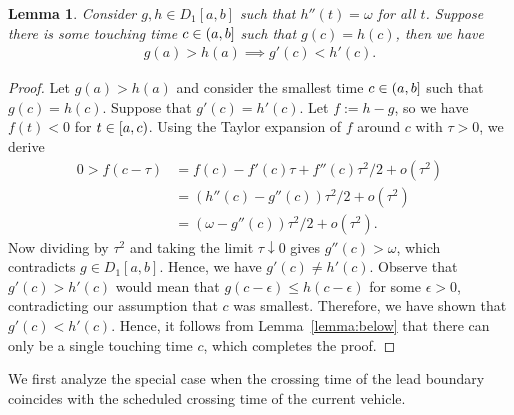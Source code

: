 \documentclass[a4paper]{article}
\theoremstyle{definition}
\theoremstyle{plain}
\newtheorem{lemma}{Lemma}
\begin{document}
\begin{lemma}
  \label{lemma:cross-acc}
  Consider $g,h \in D_{1}[a, b]$ such that $h''(t) = \omega$ for all $t$.
  Suppose there is some touching time $c \in (a,b]$ such that $g(c) = h(c)$, then
  we have
  \begin{align*}
    g(a) > h(a) \implies g'(c) < h'(c) .
  \end{align*}
\end{lemma}
\begin{proof}
  Let $g(a) > h(a)$ and consider the smallest time $c \in (a,b]$ such
  that $g(c) = h(c)$. Suppose that $g'(c) = h'(c)$. Let $f:= h - g$, so we have
  $f(t) < 0$ for $t \in [a,c)$. Using the Taylor expansion of $f$
  around $c$ with $\tau > 0$, we derive
  \begin{align*}
    0 > f(c - \tau) &= f(c) - f'(c)\tau + f''(c)\tau^{2} / 2 + o(\tau^{2}) \\
    &= (h''(c) - g''(c))\tau^{2} / 2 + o(\tau^{2}) \\
    &= (\omega - g''(c))\tau^{2} / 2 + o(\tau^{2}) .
  \end{align*}
  Now dividing by $\tau^{2}$ and taking the limit $\tau \downarrow 0$ gives
  $g''(c) > \omega$, which contradicts $g \in D_{1}[a,b]$. Hence, we have
  $g'(c) \neq h'(c)$. Observe that $g'(c) > h'(c)$ would mean that
  $g(c - \epsilon) \leq h(c - \epsilon)$ for some $\epsilon > 0$, contradicting our assumption that $c$
  was smallest. Therefore, we have shown that $g'(c) < h'(c)$. Hence, it follows
  from Lemma~\ref{lemma:below} that there can only be a single touching time $c$, which completes
  the proof.
\end{proof}


We first analyze the special case when the crossing time of the lead boundary
coincides with the scheduled crossing time of the current vehicle.
\end{document}
